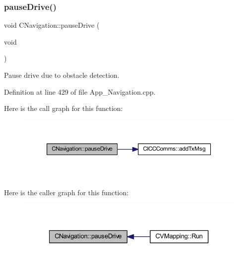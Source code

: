 \subsubsection{\texorpdfstring{pause\+Drive()}{pauseDrive()}}
{\footnotesize\ttfamily void C\+Navigation\+::pause\+Drive (\begin{DoxyParamCaption}\item[{void}]{ }\end{DoxyParamCaption})\hspace{0.3cm}{\ttfamily [virtual]}}



Pause drive due to obstacle detection. 



Definition at line 429 of file App\+\_\+\+Navigation.\+cpp.

Here is the call graph for this function\+:
\nopagebreak
\begin{figure}[H]
\begin{center}
\leavevmode
\includegraphics[width=350pt]{class_c_navigation_a27649dc6324360829d42aea67e88e3ee_cgraph}
\end{center}
\end{figure}
Here is the caller graph for this function\+:
\nopagebreak
\begin{figure}[H]
\begin{center}
\leavevmode
\includegraphics[width=327pt]{class_c_navigation_a27649dc6324360829d42aea67e88e3ee_icgraph}
\end{center}
\end{figure}
\mbox{\label{class_c_navigation_ac491c77788ba2e953a704b6ad622a665}} 
